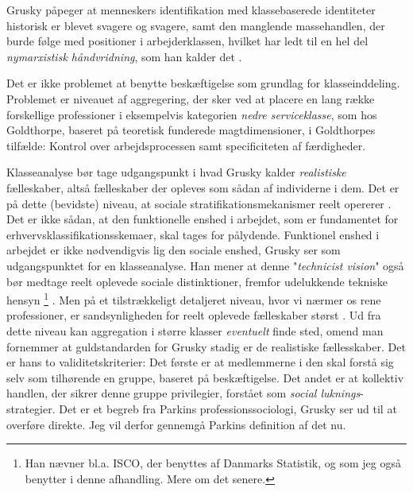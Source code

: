 Grusky påpeger at menneskers identifikation med klassebaserede identiteter historisk er blevet svagere og svagere, samt den manglende massehandlen, der burde følge med positioner i arbejderklassen, hvilket har ledt til en hel del \emph{nymarxistisk håndvridning}, som han kalder det \parencite[205]{Grusky2001}. 

Det er ikke problemet at benytte beskæftigelse som grundlag for klasseinddeling. Problemet er niveauet af aggregering, der sker ved at placere en lang række forskellige professioner i eksempelvis kategorien \emph{nedre serviceklasse}, som hos Goldthorpe, baseret på teoretisk funderede magtdimensioner, i Goldthorpes tilfælde: Kontrol over arbejdsprocessen samt specificiteten af færdigheder. 

Klasseanalyse bør tage udgangspunkt i hvad Grusky kalder \emph{realistiske} fælleskaber, altså fælleskaber der opleves som sådan af individerne i dem. Det er på dette (bevidste) niveau, at sociale stratifikationsmekanismer reelt opererer \parencite[212]{Grusky2001}. Det er ikke sådan, at den funktionelle enshed i arbejdet, som er fundamentet for erhvervsklassifikationsskemaer, skal tages for pålydende. Funktionel enshed i arbejdet er ikke nødvendigvis lig den sociale enshed, Grusky ser som udgangspunktet for en klasseanalyse. Han mener at denne "\emph{technicist vision}" %
\label{gruskytechnicistvision}%
også bør medtage reelt oplevede sociale distinktioner, fremfor udelukkende tekniske hensyn \parencite[215:fodnote 5]{Grusky2001}%
%
\footnote{Han nævner bl.a. ISCO, der benyttes af Danmarks Statistik, og som jeg også benytter i denne afhandling. Mere om det senere.}%
%
. Men på et tilstrækkeligt detaljeret niveau, hvor vi nærmer os rene professioner, er sandsynligheden for reelt oplevede fælleskaber størst \parencite[207]{Grusky2001}. Ud fra dette niveau kan aggregation i større klasser \emph{eventuelt} finde sted, omend man fornemmer at guldstandarden for Grusky stadig er de realistiske fællesskaber. Det er hans to validitetskriterier: Det første er at medlemmerne i den skal forstå sig selv som tilhørende en gruppe, baseret på beskæftigelse. Det andet er at kollektiv handlen, der sikrer denne gruppe privilegier, forstået som \emph{social luknings}-strategier. Det er et begreb fra Parkins professionssociologi, Grusky ser ud til at overføre direkte. Jeg vil derfor gennemgå Parkins definition af det nu. 

